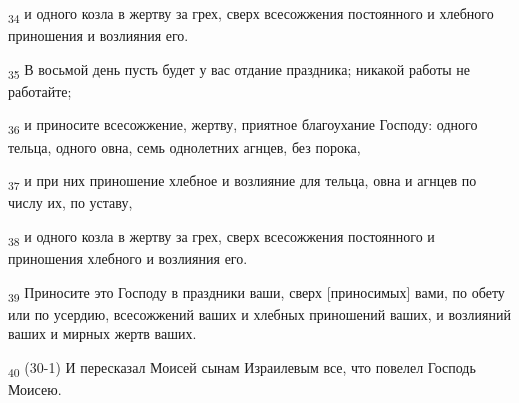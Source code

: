 \begin{tcolorbox}
\textsubscript{34} и одного козла в жертву за грех, сверх всесожжения постоянного и хлебного приношения и возлияния его.
\end{tcolorbox}
\begin{tcolorbox}
\textsubscript{35} В восьмой день пусть будет у вас отдание праздника; никакой работы не работайте;
\end{tcolorbox}
\begin{tcolorbox}
\textsubscript{36} и приносите всесожжение, жертву, приятное благоухание Господу: одного тельца, одного овна, семь однолетних агнцев, без порока,
\end{tcolorbox}
\begin{tcolorbox}
\textsubscript{37} и при них приношение хлебное и возлияние для тельца, овна и агнцев по числу их, по уставу,
\end{tcolorbox}
\begin{tcolorbox}
\textsubscript{38} и одного козла в жертву за грех, сверх всесожжения постоянного и приношения хлебного и возлияния его.
\end{tcolorbox}
\begin{tcolorbox}
\textsubscript{39} Приносите это Господу в праздники ваши, сверх [приносимых] вами, по обету или по усердию, всесожжений ваших и хлебных приношений ваших, и возлияний ваших и мирных жертв ваших.
\end{tcolorbox}
\begin{tcolorbox}
\textsubscript{40} (30-1) И пересказал Моисей сынам Израилевым все, что повелел Господь Моисею.
\end{tcolorbox}
